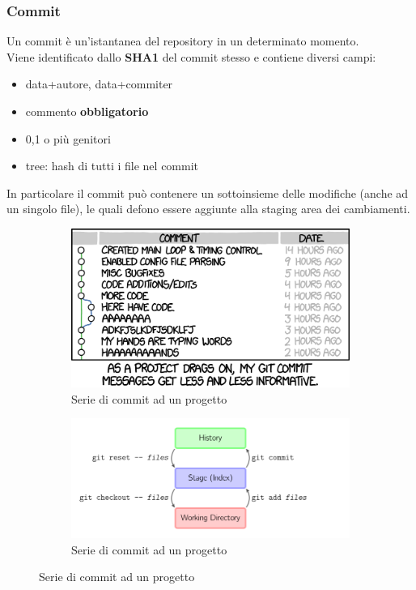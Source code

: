 \documentclass[12pt]{article}
\begin{document}
    \subsubsection{Commit}
    Un commit è un'istantanea del repository in un determinato momento.\\
    Viene identificato dallo \textbf{SHA1} del commit stesso e contiene diversi campi:
    \begin{itemize}
      \item data+autore, data+commiter
      \item commento \textbf{obbligatorio}
      \item 0,1 o più genitori
      \item tree: hash di tutti i file nel commit
    \end{itemize}
    In particolare il commit può contenere un sottoinsieme delle modifiche (anche ad un singolo file), le quali defono essere aggiunte alla staging area dei cambiamenti.
    \begin{figure}[h]
      \begin{subfigure}{0.5\textwidth}
        \includegraphics[width=0.9\linewidth]{introduzione_a_git/git_commit.png}
        \caption{Serie di commit ad un progetto}
      \end{subfigure}
      \begin{subfigure}{0.5\textwidth}
        \includegraphics[width=0.9\linewidth]{introduzione_a_git/git_commit_staging.png}
        \caption{Serie di commit ad un progetto}
      \end{subfigure}
    \end{figure}
\end{document}

